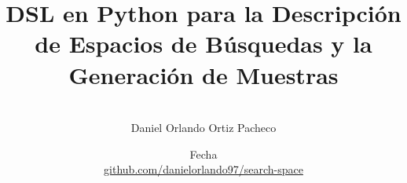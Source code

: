 \documentclass[12pt,oneside]{uhthesis}
\title{DSL en Python para la Descripción de Espacios de Búsquedas y la Generación de Muestras}
\author{\\\vspace{0.25cm}Daniel Orlando Ortiz Pacheco}
\date{Fecha\\\vspace{0.25cm}\href{https://github.com/danielorlando97/search-space}{github.com/danielorlando97/search-space}}
\begin{document}
\frontmatter
\maketitle





\tableofcontents
\lstlistoflistings

\mainmatter






\backmatter






\end{document}
